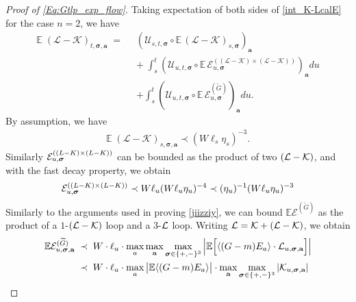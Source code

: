 \documentclass[10pt,reqno]{article}
\theoremstyle{plain} %
\theoremstyle{remark}
\numberwithin{equation}{section}
\begin{document}
\begin{proof}[Proof of \eqref{Eq:Gtlp_exp_flow}]
Taking expectation of both sides of  \eqref{int_K-LcalE} for the case $n=2$, we have  
\begin{align}\label{Eexpint_K-L}
 \mathbb E\;    (\mathcal{L} - \mathcal{K})_{t, \boldsymbol{\sigma}, \textbf{a}} \;=
 \; \; &
    \left(\mathcal{U}_{s, t, \boldsymbol{\sigma}} \circ  \mathbb E\, (\mathcal{L} - \mathcal{K})_{s, \boldsymbol{\sigma}}\right)_{\textbf{a}} \\ 
    &+ \;  \int_{s}^t \left(\mathcal{U}_{u, t, \boldsymbol{\sigma}}  \circ \mathbb E\,\mathcal{E}^{((\mathcal{L} - \mathcal{K}) \times (\mathcal{L} - \mathcal{K}))}_{u, \boldsymbol{\sigma}}\right)_{\textbf{a}} du \\
    &+   \int_{s}^t \left(\mathcal{U}_{u, t, \boldsymbol{\sigma}} \circ  \mathbb E\, \mathcal{E}^{(\widetilde{G})}_{u, \boldsymbol{\sigma}}\right)_{\textbf{a}} du.
\end{align} 
By assumption, we have 
\begin{align}\label{jdasfuao01}
  \mathbb E\;  (\mathcal{L} - \mathcal{K})_{s, \boldsymbol{\sigma},\textbf{a}}\prec (W\ell_s\eta_s)^{-3}.
\end{align}
Similarly ${\cal E}^{( (L-K)\times(L-K) )}_{u, \boldsymbol{\sigma}}$ can be bounded as the product of two ${\cal (L-K)}$, and with the fast decay property, we obtain  
\begin{align}\label{jdasfuao02}
 {\cal E}^{( (L-K)\times(L-K) )}_{u, \boldsymbol{\sigma}}\prec W\ell_u (W\ell_u\eta_u)^{-4}\prec (\eta_u)^{-1} (W\ell_u\eta_u)^{-3}
\end{align}
Similarly to the arguments used in proving \eqref{jiizziy}, we can bound $\mathbb E \mathcal{E}^{(\widetilde{G})}$ as   the product of a 
$1$-${\cal (L-K)}$ loop and a $3$-$\cal L$ loop. Writing  ${\cal L}={\cal K}+({\cal L} -{\cal K})$, we  obtain  
\begin{align}
    \mathbb E \mathcal{E}^{(\widetilde{G})}_{u, \boldsymbol{\sigma},\textbf{a}}
   \; \prec \; & \;
W\cdot\ell_u\cdot  \max_a \max_{\textbf{a}}\max_{ \boldsymbol{\sigma}\in \{+,-\}^3} \Big|\mathbb E
\Big [ \langle (G-m) E_a\rangle \cdot {\cal L}_{u,\boldsymbol{\sigma},\textbf{a}} \Big ] \Big|
 \nonumber \\
  \; \prec \; & \;
W\cdot\ell_u\cdot \max_a  \big|\mathbb E \langle (G-m) E_a\rangle \big|
 \cdot 
 \max_{\textbf{a}}\max_{ \boldsymbol{\sigma}\in \{+,-\}^3} \left|{\cal K}_{u,\boldsymbol{\sigma},\textbf{a}}\right|
\nonumber \\

\end{align}
\end{proof}
\end{document}
